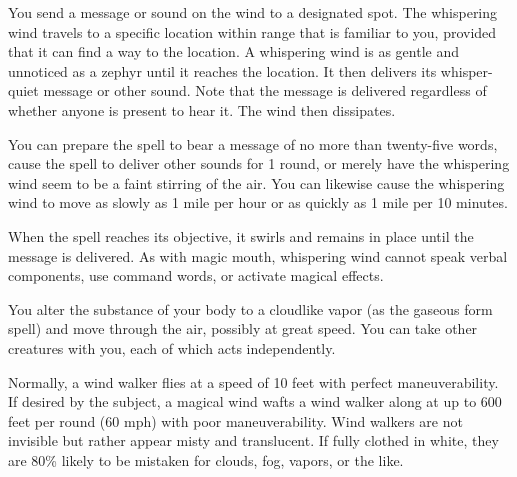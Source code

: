 \begin{multicols}{2}
\begin{small}
\noindent You send a message or sound on the wind to a designated spot. The whispering wind travels to a specific location within range that is familiar to you, provided that it can find a way to the location. A whispering wind is as gentle and unnoticed as a zephyr until it reaches the location. It then delivers its whisper-quiet message or other sound. Note that the message is delivered regardless of whether anyone is present to hear it. The wind then dissipates.

\smallskip\noindent You can prepare the spell to bear a message of no more than twenty-five words, cause the spell to deliver other sounds for 1 round, or merely have the whispering wind seem to be a faint stirring of the air. You can likewise cause the whispering wind to move as slowly as 1 mile per hour or as quickly as 1 mile per 10 minutes.

\smallskip\noindent When the spell reaches its objective, it swirls and remains in place until the message is delivered. As with magic mouth, whispering wind cannot speak verbal components, use command words, or activate magical effects.

\noindent You alter the substance of your body to a cloudlike vapor (as the gaseous form spell) and move through the air, possibly at great speed. You can take other creatures with you, each of which acts independently.

\smallskip\noindent Normally, a wind walker flies at a speed of 10 feet with perfect maneuverability. If desired by the subject, a magical wind wafts a wind walker along at up to 600 feet per round (60 mph) with poor maneuverability. Wind walkers are not invisible but rather appear misty and translucent. If fully clothed in white, they are 80\% likely to be mistaken for clouds, fog, vapors, or the like.


\end{small}
\end{multicols}
